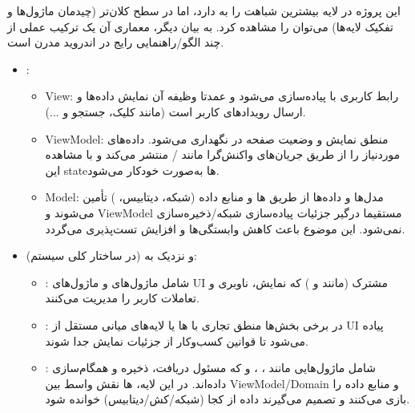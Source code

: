 
این پروژه در لایه  بیشترین شباهت را به  دارد، اما در سطح کلان‌تر (چیدمان ماژول‌ها و تفکیک لایه‌ها) می‌توان  را مشاهده کرد. به بیان دیگر، معماری آن یک {ترکیب عملی} از چند الگو/راهنمایی رایج در اندروید مدرن است.

\begin{itemize}
  \item {:}
  \begin{itemize}
    \item {View}: رابط کاربری با  پیاده‌سازی می‌شود و عمدتا وظیفه آن نمایش داده‌ها و ارسال رویدادهای کاربر است (مانند کلیک، جستجو و ...).
    \item {ViewModel}: منطق نمایش و وضعیت صفحه در  نگهداری می‌شود.  داده‌های موردنیاز  را از طریق جریان‌های واکنش‌گرا مانند / منتشر می‌کند و  با مشاهده این stateها به‌صورت خودکار  می‌شود.
    \item {Model}: مدل‌ها و داده‌ها از طریق ها و منابع داده (شبکه، دیتابیس، ) تأمین می‌شوند و ViewModel مستقیما درگیر جزئیات پیاده‌سازی شبکه/ذخیره‌سازی نمی‌شود. این موضوع باعث کاهش وابستگی‌ها و افزایش تست‌پذیری می‌گردد.
  \end{itemize}

  \item { و نزدیک به  (در ساختار کلی سیستم):}
  \begin{itemize}
    \item {:} شامل ماژول‌های  و ماژول‌های UI مشترک (مانند  و ) که نمایش، ناوبری و تعاملات کاربر را مدیریت می‌کنند.
    \item {:} در برخی بخش‌ها منطق تجاری با ها یا لایه‌های میانی مستقل از UI پیاده می‌شود تا قوانین کسب‌وکار از جزئیات نمایش جدا شوند. 
    \item {:} شامل ماژول‌هایی مانند ، ،  و  که مسئول دریافت، ذخیره و همگام‌سازی داده‌اند. در این لایه، ها نقش واسط بین ViewModel/Domain و منابع داده را بازی می‌کنند و تصمیم می‌گیرند داده از کجا (شبکه/کش/دیتابیس) خوانده شود.
  \end{itemize}

\end{itemize}

